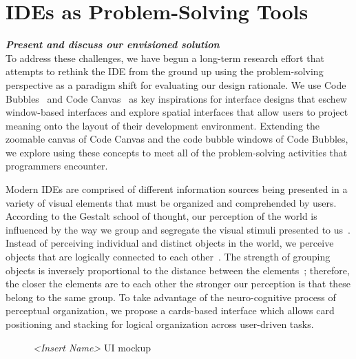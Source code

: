 \documentclass{ppig}
\newcommand{\bold}[1]{\textit{\textbf{\color{aoblue}#1}}} %
\newcommand{\nameUI}{\textit{<Insert Name>} UI} %
\begin{document}
\section{IDEs as Problem-Solving Tools}
\bold{Present and discuss our envisioned solution\\}
To address these challenges, we have begun a long-term research effort that attempts to rethink the IDE from the ground up using the problem-solving perspective as a paradigm shift for evaluating our design rationale.
We use Code Bubbles~\cite{bragdon2010bubbles} and Code Canvas~\cite{deline2010canvas} as key inspirations for interface designs that eschew window-based interfaces and explore spatial interfaces that allow users to project meaning onto the layout of their development environment.
Extending the zoomable canvas of Code Canvas and the code bubble windows of Code Bubbles, we explore using these concepts to meet all of the problem-solving activities that programmers encounter.

Modern IDEs are comprised of different information sources being presented in a variety of visual elements that must be organized and comprehended by users.
According to the Gestalt school of thought, our perception of the world is influenced by the way we group and segregate the visual stimuli presented to us~\cite{kimchi2003perceptual}.
Instead of perceiving individual and distinct objects in the world, we perceive objects that are logically connected to each other~\cite{kimchi2003perceptual}.
The strength of grouping objects is inversely proportional to the distance between the elements~\cite{bergman2009peirce}; therefore, the closer the elements are to each other the stronger our perception is that these belong to the same group.
To take advantage of the neuro-cognitive process of perceptual organization, we propose a cards-based interface which allows card positioning and stacking for logical organization across user-driven tasks.

\begin{figure}[h!]
	\caption{\nameUI{} mockup}
	\label{mockup}
	\vspace*{-1.5\baselineskip}
\end{figure}
\end{document}
